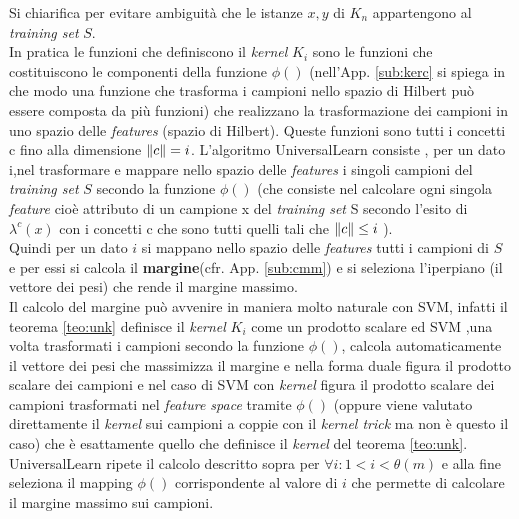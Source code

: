 Si chiarifica per evitare ambiguità che le istanze $x,y$ di $K_n$ appartengono al \textit{training set} $S$. \\
In pratica le funzioni che definiscono il \textit{kernel} $K_i$  sono le funzioni che costituiscono le componenti della funzione $\phi()$ (nell'App. \ref{sub:kerc} si spiega in che modo una funzione che trasforma i campioni nello spazio di Hilbert può essere composta da più funzioni) che realizzano la trasformazione dei campioni in uno spazio delle \textit{features} (spazio di Hilbert). Queste funzioni sono tutti i concetti c fino alla dimensione $\lVert c\rVert = i$.  L'algoritmo UniversalLearn consiste , per un dato i,nel trasformare e mappare nello spazio delle \textit{features} i singoli campioni del \textit{training set} $S$ secondo la funzione $\phi()$ (che consiste nel calcolare ogni singola \textit{feature} cioè attributo di un campione x del \textit{training set} S secondo l'esito di $\lambda^{c}(x)$ con i concetti c che sono tutti quelli tali che $\lVert c\rVert \leq i$ ).\\
Quindi per un dato $i$ si mappano nello spazio delle \textit{features} tutti i campioni di $S$ e per essi si calcola il \textbf{margine}(cfr. App. \ref{sub:cmm}) e si seleziona l'iperpiano (il vettore dei pesi) che rende il margine massimo.\\
Il calcolo del margine può avvenire in maniera molto naturale con \ac{SVM}, infatti il teorema \ref{teo:unk} definisce il \textit{kernel} $K_i$ come un prodotto scalare ed  \ac{SVM}  ,una volta trasformati i campioni secondo la funzione $\phi()$,  calcola automaticamente il vettore dei pesi che massimizza il margine e nella  forma duale figura il prodotto scalare dei campioni e nel caso di \ac{SVM} con \textit{kernel} figura il prodotto scalare dei  campioni trasformati nel \textit{feature space} tramite $\phi()$ (oppure viene valutato direttamente il \textit{kernel} sui campioni a coppie con il \textit{kernel trick} ma non è questo il caso) che è esattamente quello che definisce il \textit{kernel} del teorema  \ref{teo:unk}.\\
UniversalLearn ripete il calcolo descritto sopra per  $\forall i : 1<i<\theta(m)$ e alla fine seleziona il mapping $\phi()$ corrispondente al valore di $i$ che permette di calcolare il margine massimo sui campioni.\\
